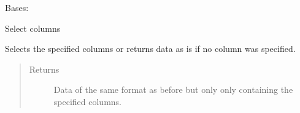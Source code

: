 \documentclass[letterpaper,10pt,english]{sphinxmanual}
\begin{document}
\begin{fulllineitems}
\label{\detokenize{dalio.pipe:dalio.pipe.select.ColSelect}}
Bases: 

Select columns

\begin{fulllineitems}
\label{\detokenize{dalio.pipe:dalio.pipe.select.ColSelect.transform}}
Selects the specified columns or returns data as is if no column
was specified.
\begin{quote}\begin{description}
\item[{Returns}] \leavevmode
Data of the same format as before but only only containing the
specified columns.

\end{description}\end{quote}

\end{fulllineitems}


\end{fulllineitems}

\end{document}
